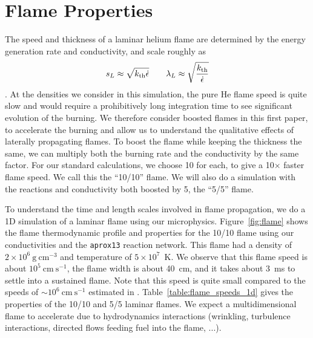 \documentclass[preprint,times,tighten]{aastex63}
\newcommand{\epsdot}{\dot{\epsilon}}
\newcommand{\kth}{k_{\rm th}}
\newcommand{\gcc}{\mathrm{g~cm^{-3} }}
\newcommand{\cms}{\mathrm{cm~s^{-1} }}
\newcommand{\AssignTo}[1]{
    \marginpar{\vskip-\baselineskip%
               \raggedright%
               \tiny\sffamily%
               {\color{blue}\hrule%
               \smallskip%
               #1\par%
               \smallskip%
               \hrule}}%
}
\begin{document}
\section{Flame Properties}\label{Sec:Flame}

The speed and thickness of a laminar helium flame are determined by the
energy generation rate and conductivity, and scale roughly as
\begin{equation}
\label{eq:flame_scaling}
s_L \approx \sqrt{\kth \epsdot} \qquad
\lambda_L \approx \sqrt{\frac{\kth}{\epsdot}}
\end{equation}
\citep{orourke:1979,khokhlov:1993}.
At the densities we consider in this simulation, the pure He flame
speed is quite slow and would require a prohibitively long integration
time to see significant evolution of the burning.  We therefore
consider boosted flames in this first paper, to accelerate the burning
and allow us to understand the qualitative effects of laterally
propagating flames.  To boost the flame while keeping the thickness
the same, we can multiply both the burning rate and the conductivity
by the same factor.  For our standard calculations, we choose 10 for
each, to give a 10$\times$ faster flame speed.  We call this the ``10/10''
flame.  We will also do a simulation with the reactions and
conductivity both boosted by 5, the ``5/5'' flame.

To understand the time and length scales involved in flame
propagation, we do a 1D simulation of a laminar flame using our
microphysics.  Figure~\ref{fig:flame} shows the flame thermodynamic
profile and properties for the 10/10 flame using
our conductivities and the {\tt aprox13} reaction network.  This flame
had a density of $2\times 10^6~\gcc$ and
temperature of $5\times 10^7$~K.  We observe that this flame speed is
about $10^5~\cms$, the flame width is about 40~cm, and it
takes about 3~ms to settle into a sustained flame.  Note that this speed
is quite small compared to the speeds of $\sim 10^6~\cms$ estimated in
\citet{spitkovsky2002}.  Table~\ref{table:flame_speeds_1d} gives the properties
of the 10/10 and 5/5 laminar flames.  We expect a multidimensional flame to
accelerate due to hydrodynamics interactions (wrinkling, turbulence
interactions, directed flows feeding fuel into the flame, ...).


\begin{figure*}[t]
\caption{\label{fig:flame} Time-evolution of the 10$\times$ boosted 1D
	laminar flame. The left plot shows temperature and nuclear energy
	generation profiles at 11 different times, while the right plot
	shows flame propagation speed and flame thickness as functions of time.}
\end{figure*}
\end{document}
